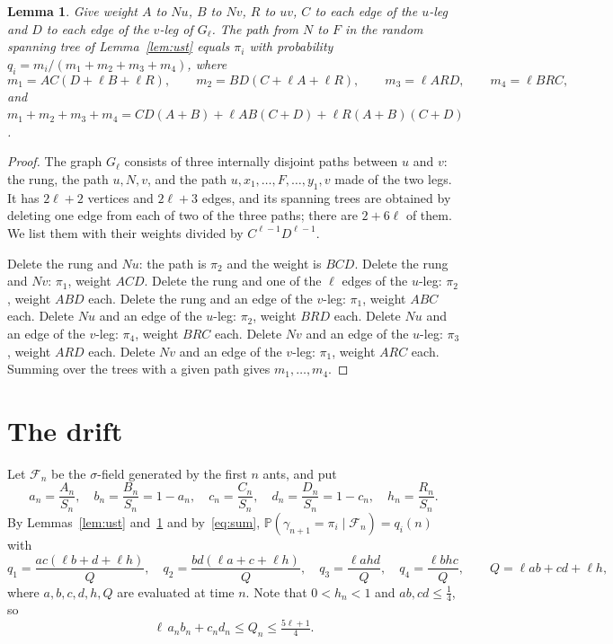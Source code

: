 \documentclass[11pt]{amsart}
\newtheorem{lemma}[theorem]{Lemma}
\theoremstyle{remark}
\newcommand{\PP}{\mathbb{P}}
\newcommand{\cF}{\mathcal{F}}
\begin{document}
\begin{lemma}\label{lem:law}
Give weight $A$ to $Nu$, $B$ to $Nv$, $R$ to $uv$, $C$ to each edge of the $u$-leg and $D$ to each edge of the $v$-leg
of $G_\ell$. The path from $N$ to $F$ in the random spanning tree of Lemma~\ref{lem:ust} equals $\pi_i$ with
probability $q_i=m_i/(m_1+m_2+m_3+m_4)$, where
\[
m_1=AC(D+\ell B+\ell R),\qquad m_2=BD(C+\ell A+\ell R),\qquad m_3=\ell ARD,\qquad m_4=\ell BRC,
\]
and $m_1+m_2+m_3+m_4=CD(A+B)+\ell AB(C+D)+\ell R(A+B)(C+D)$.
\end{lemma}
\begin{proof}
The graph $G_\ell$ consists of three internally disjoint paths between $u$ and $v$: the rung, the path $u,N,v$, and
the path $u,x_1,\dots,F,\dots,y_1,v$ made of the two legs. It has $2\ell+2$ vertices and $2\ell+3$ edges, and its
spanning trees are obtained by deleting one edge from each of two of the three paths; there are $2+6\ell$ of them. We
list them with their weights divided by $C^{\ell-1}D^{\ell-1}$.

Delete the rung and $Nu$: the path is $\pi_2$ and the weight is $BCD$. Delete the rung and $Nv$: $\pi_1$, weight $ACD$.
Delete the rung and one of the $\ell$ edges of the $u$-leg: $\pi_2$, weight $ABD$ each. Delete the rung and an edge of
the $v$-leg: $\pi_1$, weight $ABC$ each. Delete $Nu$ and an edge of the $u$-leg: $\pi_2$, weight $BRD$ each. Delete
$Nu$ and an edge of the $v$-leg: $\pi_4$, weight $BRC$ each. Delete $Nv$ and an edge of the $u$-leg: $\pi_3$, weight
$ARD$ each. Delete $Nv$ and an edge of the $v$-leg: $\pi_1$, weight $ARC$ each. Summing over the trees with a given
path gives $m_1,\dots,m_4$.
\end{proof}

\section{The drift}

Let $\cF_n$ be the $\sigma$-field generated by the first $n$ ants, and put
\[
a_n=\frac{A_n}{S_n},\quad b_n=\frac{B_n}{S_n}=1-a_n,\quad c_n=\frac{C_n}{S_n},\quad d_n=\frac{D_n}{S_n}=1-c_n,
\quad h_n=\frac{R_n}{S_n} .
\]
By Lemmas~\ref{lem:ust} and~\ref{lem:law} and by~\eqref{eq:sum}, $\PP(\gamma_{n+1}=\pi_i\mid\cF_n)=q_i(n)$ with
\begin{equation}\label{eq:q}
q_1=\frac{ac(\ell b+d+\ell h)}{Q},\quad q_2=\frac{bd(\ell a+c+\ell h)}{Q},\quad q_3=\frac{\ell ahd}{Q},\quad
q_4=\frac{\ell bhc}{Q},\qquad Q=\ell ab+cd+\ell h,
\end{equation}
where $a,b,c,d,h,Q$ are evaluated at time $n$. Note that $0<h_n<1$ and $ab,cd\le\frac14$, so
\begin{equation}\label{eq:Qbound}
\ell\,a_nb_n+c_nd_n\le Q_n\le\tfrac{5\ell+1}{4} .
\end{equation}
\end{document}
